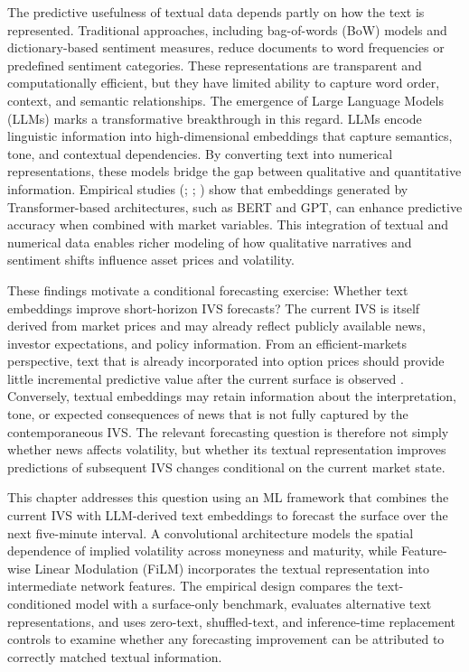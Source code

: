The predictive usefulness of textual data depends partly on how the text is represented. Traditional approaches, including bag-of-words (BoW) models and dictionary-based sentiment measures, reduce documents to word frequencies or predefined sentiment categories. These representations are transparent and computationally efficient, but they have limited ability to capture word order, context, and semantic relationships. The emergence of Large Language Models (LLMs) marks a transformative breakthrough in this regard. LLMs encode linguistic information into high-dimensional embeddings that capture semantics, tone, and contextual dependencies. By converting text into numerical representations, these models bridge the gap between qualitative and quantitative information. Empirical studies (\cite{chen2021stock}; \cite{ji2021stock}; \cite{chen2022expected}) show that embeddings generated by Transformer-based architectures, such as BERT and GPT, can enhance predictive accuracy when combined with market variables. This integration of textual and numerical data enables richer modeling of how qualitative narratives and sentiment shifts influence asset prices and volatility.





These findings motivate a conditional forecasting exercise:  
Whether text embeddings improve short-horizon IVS forecasts?  The current IVS is itself derived from market prices and may already reflect publicly available news, investor expectations, and policy information. From an efficient-markets perspective, text that is already incorporated into option prices should provide little incremental predictive value after the current surface is observed \citep{fama1970}. Conversely, textual embeddings may retain information about the interpretation, tone, or expected consequences of news that is not fully captured by the contemporaneous IVS. The relevant forecasting question is therefore not simply whether news affects volatility, but whether its textual representation improves predictions of subsequent IVS changes conditional on the current market state.




This chapter addresses this question using an ML framework that combines the current IVS with LLM-derived text embeddings to forecast the surface over the next five-minute interval. A convolutional architecture models the spatial dependence of implied volatility across moneyness and maturity, while Feature-wise Linear Modulation (FiLM) incorporates the textual representation into intermediate network features. The empirical design compares the text-conditioned model with a surface-only benchmark, evaluates alternative text representations, and uses zero-text, shuffled-text, and inference-time replacement controls to examine whether any forecasting improvement can be attributed to correctly matched textual information.



